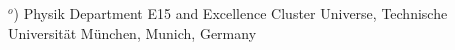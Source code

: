 \documentclass[encoding=utf8,british]{tumphthesis}
\begin{document}
\begin{titlepage}
\begin{center}
$^o$)  Physik Department E15 and Excellence Cluster Universe, Technische  Universit{\"a}t M{\"u}nchen, Munich, Germany\\[1mm]                           
\vspace*{20mm}


\end{center}
\end{titlepage}
\end{document}
